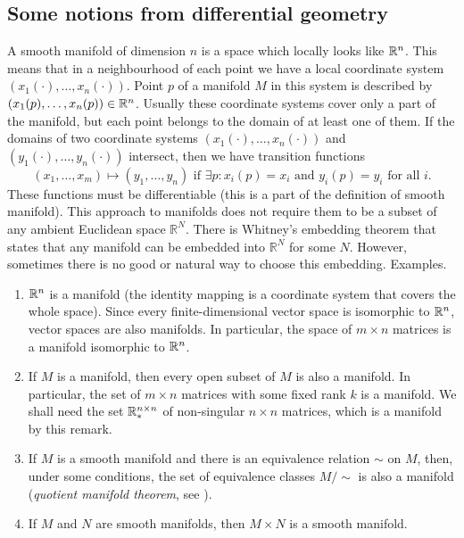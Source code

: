 \subsection{Some notions from differential geometry}
A smooth manifold of dimension $n$ is a space which locally 
looks like $\mathbb{R}^n$. 
This means that in a neighbourhood of each point we have a local coordinate system $(x_1(\cdot), \dots,  x_n(\cdot))$.
Point $p$ of a manifold $M$ in this system is described by $(x_1(p), \dots, x_n(p)) \in \mathbb{R}^n$. Usually these coordinate systems 
cover only a part of the manifold, but each point belongs to the domain
of at least one of them.
If the domains of two coordinate systems $(x_1(\cdot), \dots, x_n(\cdot))$
and $(y_1(\cdot), \dots, y_n(\cdot))$ intersect, then we have transition functions
\begin{equation}
(x_1, \dots, x_m) \mapsto (y_1, \dots, y_n) \mbox{ if } \exists p : x_i(p) = x_i \mbox{ and } y_i(p) = y_i \mbox{ for all } i.
\end{equation}
These functions must be differentiable (this is a part of the definition of smooth manifold).
This approach to manifolds does not require them to be a subset of 
any ambient Euclidean space $\mathbb{R}^N$. There is Whitney's embedding theorem 
that states that any manifold can be embedded into $\mathbb{R}^N$
for some $N$. However, sometimes there is no good or natural way to choose this embedding.
Examples.
\begin{enumerate}
    \item $\mathbb{R}^n$ is a manifold (the identity mapping is a coordinate system that
        covers the whole space). Since every finite-dimensional vector space is 
        isomorphic to $\mathbb{R}^n$, vector spaces are also manifolds. In particular,
        the space of $m \times n$ matrices is a manifold isomorphic to $\mathbb{R}^n$.
    \item If $M$ is a manifold, then every open subset of $M$ is also a manifold.
        In particular, the set of $m \times n$ matrices with some fixed rank $k$
        is a manifold. We shall need the set $\mathbb{R}^{n \times n}_{*}$ of non-singular $n \times n$ matrices,
        which is a manifold by this remark.
    \item If $M$ is a smooth manifold and there is an equivalence relation $\sim$ on $M$,
        then, under some conditions, the set of equivalence classes $M / \sim$ is 
        also a manifold (\textit{quotient manifold theorem}, see \cite{lee_manifolds}).
    \item If $M$ and $N$ are smooth manifolds, then $M \times N$ is a smooth
        manifold.
\end{enumerate}


